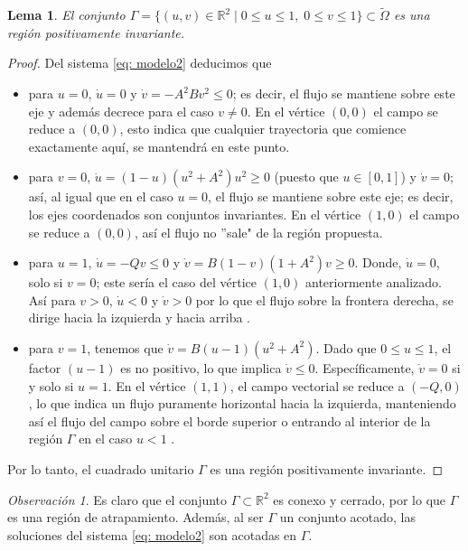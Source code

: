 \documentclass[]{article}
\newtheorem{lemma}{Lema}[section]
\theoremstyle{remark}
\newtheorem{remark}{Observación}
\begin{document}
	\begin{lemma}
		El conjunto $\Gamma = \{ (u, v) \in \mathbb{R}^{2} \; | \; 0 \leq u \leq 1, \; 0 \leq v \leq 1 \} \subset \tilde{\Omega}$ es una región positivamente invariante.
	\end{lemma}
	\begin{proof}
		Del sistema \eqref{eq: modelo2} deducimos que 
		\begin{itemize}
			\item para $u = 0$, $\dot{u} = 0$ y $\dot{v} = -A^2Bv^2 \leq 0$; es decir, el flujo se mantiene sobre este eje y además decrece para el caso $v\neq0$. En el vértice $(0, 0)$ el campo se reduce a $(0,0)$, esto indica que cualquier trayectoria que comience exactamente aquí, se mantendrá en este punto.
			\item para $v = 0$, $\dot{u} = (1 - u)(u^{2} + A^{2})u^{2} \geq 0$ (puesto que $u \in [0, 1]$) y $\dot{v} = 0$; así, al igual que en el caso $u=0$, el flujo se mantiene sobre este eje; es decir, los ejes coordenados son conjuntos invariantes. En el vértice $(1, 0)$ el campo se reduce a $(0,0)$, así el flujo no ''sale" de la región propuesta.
			\item para $u=1$, $\dot{u} = -Qv \leq 0$ y $\dot{v} = B(1 - v)(1 + A^{2})v \geq 0$. Donde, $\dot{u} = 0$, solo si $v=0$; este sería el caso del vértice $(1,0)$ anteriormente analizado. Así para $v>0$, $\dot{u} < 0$ y $\dot{v} > 0$ por lo que el flujo sobre la frontera derecha, se dirige hacia la izquierda y hacia arriba \cite{chicone}. 
			\item para $v=1$, tenemos que $\dot{v}=B(u-1)(u^2+A^2)$. Dado que $0\leq u \leq1$, el factor $(u-1)$ es no positivo, lo que implica $\dot{v} \leq0$. Específicamente, $\dot{v} =0$ si y solo si $u=1$. En el vértice $(1,1)$, el campo vectorial se reduce a $(-Q,0)$, lo que indica un flujo puramente horizontal hacia la izquierda, manteniendo así el flujo del campo sobre el borde superior o entrando al interior de la región $\Gamma$ en el caso $u<1$ \cite{chicone}.
		\end{itemize}
		\noindent Por lo tanto, el cuadrado unitario $\Gamma$ es una región positivamente invariante.
	\end{proof}
	
	\begin{remark}
		Es claro que el conjunto $\Gamma \subset \mathbb{R}^2$ es conexo y cerrado, por lo que $\Gamma$ es una región de atrapamiento. Además, al ser $\Gamma$ un conjunto acotado, las soluciones del sistema \eqref{eq: modelo2} son acotadas en  $\Gamma$.
	\end{remark}
	
\end{document}
